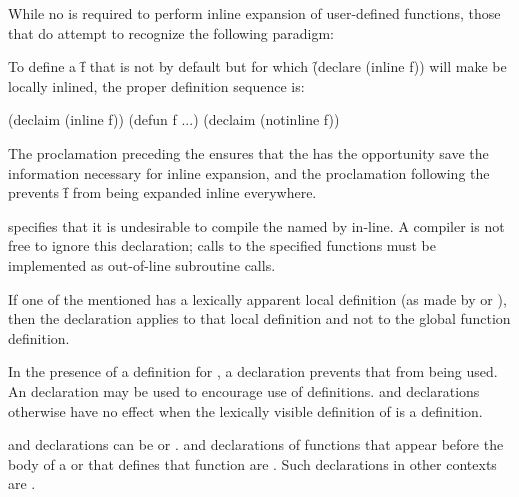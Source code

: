 While no  is required to perform inline expansion
of user-defined functions, those  that do attempt
to recognize the following paradigm:

To define a  \f{f} that is not  by default
but for which \f{(declare (inline f))} will make  be locally inlined,
the proper definition sequence is:
    
\code
 (declaim (inline f))
 (defun f ...)
 (declaim (notinline f))
\endcode

The  proclamation preceding the  
ensures that the  has the opportunity save the information
necessary for inline expansion, and the  proclamation 
following the   prevents \f{f} from being expanded
inline everywhere.  

 specifies that it is
undesirable to compile the 
named by  in-line.
A compiler is not free to ignore this declaration;
calls to the specified functions must be implemented as out-of-line subroutine calls.

If one of the 
mentioned has a lexically apparent local definition
(as made by  or ), then the declaration
applies to that local definition and not to the global function definition.

In the presence of a  definition for 
, a  declaration prevents that
 from being used.
An  declaration may be used to encourage use of 
 definitions.   and 
declarations otherwise have no effect when the lexically visible definition
of  is a  definition.


 and  declarations can be  or
.                  
 and  declarations of functions that
appear before the body of a 
 or  
 that defines that function are .  
Such declarations in other contexts are .

